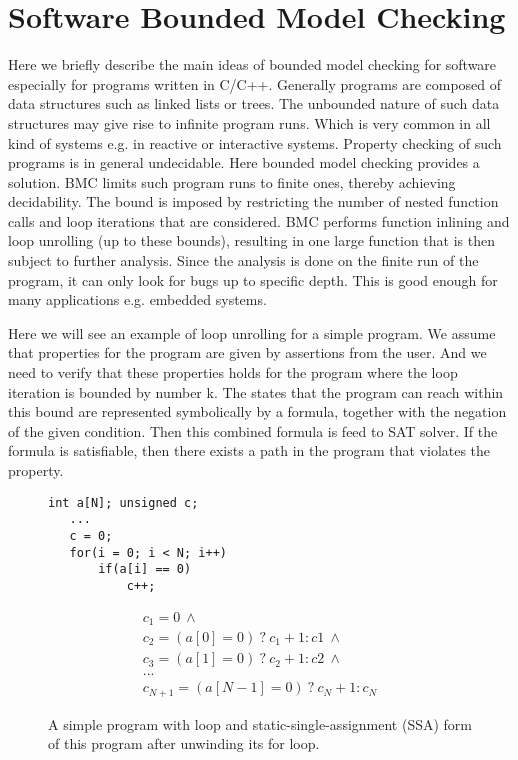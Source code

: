 \documentclass[14pt]{article}
\begin{document}
{\section{Software Bounded Model Checking}\label{Software Bounded Model Checking}
Here we briefly describe the main ideas of bounded model checking for software especially for programs written in C/C++. Generally programs are composed of data structures such as linked lists or trees. The unbounded nature of such data structures may give rise to infinite program runs. Which is very common in all kind of systems e.g. in reactive or interactive systems. Property checking of such programs is in general undecidable. Here bounded model checking provides a solution. BMC limits such program runs to finite ones, thereby achieving decidability. The bound is imposed by restricting the number of nested function calls and loop iterations that are considered. BMC performs function inlining and loop unrolling (up to these bounds), resulting in one large function that is then subject to further analysis. Since the analysis is done on the finite run of the program, it  can only look for bugs up to specific depth. This is good enough for many applications e.g. embedded systems. 

Here we will see an example of loop unrolling for a simple program. We assume that properties for the program are given by assertions from  the user. And we need to verify that these properties holds for the program where the loop iteration is bounded by number k. The states that the program can reach within this bound are represented symbolically by a formula, together with the negation of the given condition. Then this combined formula is feed to SAT solver. If the formula is satisfiable, then there exists a path in the program that violates the property. 

\begin{figure}[ht]
\centering
\begin{minipage}[t]{0.45\linewidth}
\begin{lstlisting}
int a[N]; unsigned c;
   ...
   c = 0;
   for(i = 0; i < N; i++)
       if(a[i] == 0)
           c++;
\end{lstlisting}
\end{minipage}
\quad
\begin{minipage}[t]{0.45\linewidth}
\begin{gather*}
c_1 = 0 \  \wedge\\
c_2 = (a[0] = 0) \ ?\  c_1 + 1 : c1 \ \wedge\\
c_3 = (a[1] = 0)\  ?\  c_2 + 1 : c2 \ \wedge\\
...\\
c_{N+1} = (a[N-1] = 0) \ ?\  c_N + 1 : c_N
\end{gather*}
\end{minipage}
\caption{A simple program with loop and static-single-assignment (SSA) form of this program after unwinding its for loop.}
\end{figure}






}
\end{document}

